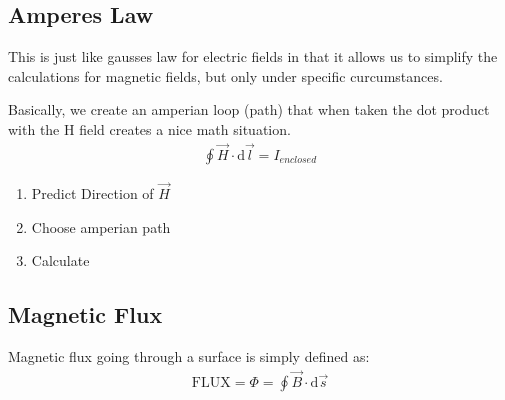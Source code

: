 \documentclass[12pt,letterpaper]{article} \usepackage{amsmath} \usepackage{graphicx} \usepackage[margin=1in]{geometry} \usepackage{longtable}  \usepackage{amssymb}
\begin{document}
	\subsection{Amperes Law}
	This is just like gausses law for electric fields in that it allows us to simplify the calculations for magnetic fields, but only under specific curcumstances. 
	
	Basically, we create an amperian loop (path) that when taken the dot product with the H field creates a nice math situation.
	\begin{align*}
		\oint \vec H \cdot \mathrm d \vec l = I_{enclosed}
	\end{align*}
	\begin{enumerate}[noitemsep]
		\item Predict Direction of $\vec H$
		\item Choose amperian path
		\item Calculate
	\end{enumerate}

	\subsection{Magnetic Flux}
	Magnetic flux going through a surface is simply defined as:
	\begin{align*}
		\text{FLUX} = \Phi = \oint \vec B \cdot \mathrm d \vec s
	\end{align*}
	
\end{document}
